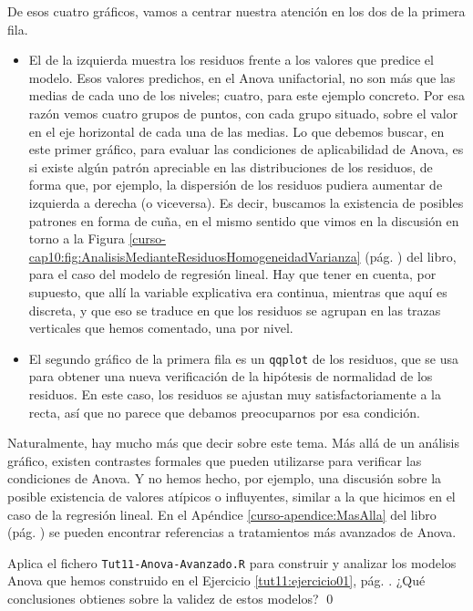 \documentclass[10pt,a4paper]{article}\usepackage[]{graphicx}\usepackage[]{color}
\newcounter {cont01}
\begin{document}
De esos cuatro gráficos, vamos a centrar nuestra atención en los dos de la primera fila.
\begin{itemize}
   \item El de la izquierda muestra los residuos frente a los valores que predice el modelo. Esos valores predichos, en el Anova unifactorial, no  son más que las medias de cada uno de los niveles; cuatro, para este ejemplo concreto. Por esa razón vemos cuatro grupos de puntos, con cada grupo situado, sobre el valor en el eje horizontal de cada una de las medias. Lo que debemos buscar, en este primer gráfico, para evaluar las condiciones de aplicabilidad de Anova, es si existe algún patrón apreciable en las distribuciones de los residuos, de forma que, por ejemplo, la dispersión de los residuos pudiera aumentar de izquierda a derecha (o viceversa). Es decir, buscamos la existencia de posibles patrones en forma de cuña, en el mismo sentido que vimos en la discusión en torno a la Figura \ref{curso-cap10:fig:AnalisisMedianteResiduosHomogeneidadVarianza} (pág. \pageref{curso-cap10:fig:AnalisisMedianteResiduosHomogeneidadVarianza}) del libro, para el caso del modelo de regresión lineal. Hay que tener en cuenta, por supuesto, que allí la variable explicativa era continua, mientras que aquí es discreta, y que eso se traduce en que los residuos se agrupan en las trazas verticales que hemos comentado, una por nivel.

  \item El segundo gráfico de la primera fila es un {\tt qqplot} de los residuos, que se usa para obtener una nueva verificación de la hipótesis de normalidad de los residuos. En este caso, los residuos se ajustan muy satisfactoriamente a la recta, así que no parece que debamos preocuparnos por esa condición.

\end{itemize}


Naturalmente, hay mucho más que decir sobre este tema. Más allá de un análisis gráfico, existen
contrastes formales que pueden utilizarse para verificar las condiciones de Anova. Y no hemos
hecho, por ejemplo, una discusión sobre la posible existencia de valores atípicos o influyentes,
similar a la que hicimos en el caso de la regresión lineal. En el Apéndice \ref{curso-apendice:MasAlla} del libro (pág. \pageref{curso-apendice:MasAlla}) se pueden
encontrar referencias a tratamientos más avanzados de Anova.

\begin{ejercicio}
\label{tut11:ejercicio04}
Aplica el fichero {\tt Tut11-Anova-Avanzado.R} para construir y analizar los modelos Anova que hemos construido en el Ejercicio \ref{tut11:ejercicio01}, pág. \pageref{tut11:ejercicio01}. ¿Qué conclusiones obtienes sobre la validez de estos modelos?
\qed
\end{ejercicio}
\end{document}
